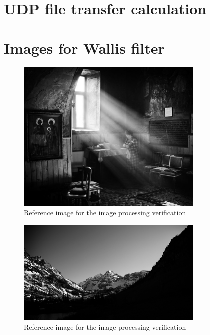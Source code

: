 \section{UDP file transfer calculation} \label{app:uftcalc}


\section{Images for Wallis filter} \label{app:images_wallis}
\begin{figure}[H]
    \centering
    \includegraphics[width=0.8\textwidth]{appendices/ref_room.png}
    \caption{Reference image for the image processing verification}
    \label{fig:ref_room}
\end{figure}

\begin{figure}[H]
    \centering
    \includegraphics[width=0.8\textwidth]{appendices/ref_mountain.png}
    \caption{Reference image for the image processing verification}
    \label{fig:ref_mountain}
\end{figure}
